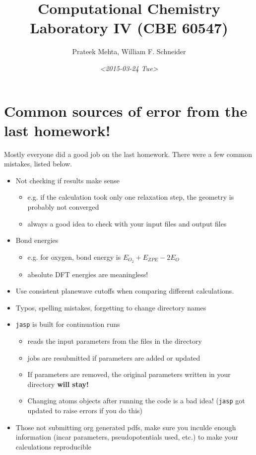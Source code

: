 \documentclass[11pt]{article}
\author{Prateek Mehta, William F. Schneider}
\date{\textit{<2015-03-24 Tue>}}
\title{Computational Chemistry Laboratory IV (CBE 60547)}
\begin{document}
\maketitle


\section{Common sources of error from the last homework!}
\label{sec-1}

Mostly everyone did a good job on the last homework. There were a few common mistakes, listed below.

\begin{itemize}
\item Not checking if results make sense
\begin{itemize}
\item e.g. if the calculation took only one relaxation step, the geometry is probably not converged
\item always a good idea to check with your input files and output files
\end{itemize}

\item Bond energies 
\begin{itemize}
\item e.g. for oxygen, bond energy is $E_{O_{2}} + E_{ZPE} - 2E_{O}$
\item absolute DFT energies are meaningless!
\end{itemize}

\item Use consistent planewave cutoffs when comparing different calculations.

\item Typos, spelling mistakes, forgetting to change directory names

\item \texttt{jasp} is built for continuation runs
\begin{itemize}
\item reads the input parameters from the files in the directory
\item jobs are resubmitted if parameters are added or updated
\item If parameters are removed, the original parameters written in your directory \textbf{will stay!}
\item Changing atoms objects after running the code is a bad idea! (\texttt{jasp} got updated to raise errors if you do this)
\end{itemize}

\item Those not submitting org generated pdfs, make sure you inculde enough information (incar parameters, pseudopotentials used, etc.) to make your calculations reproducible
\end{itemize}
\end{document}
